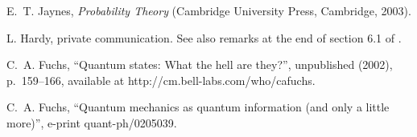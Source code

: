 \documentclass[pra,12pt,tightenlines]{revtex4}
\begin{document}
\begin{thebibliography}{10}
E.~T. Jaynes, {\em Probability Theory\/} 
(Cambridge University Press, Cambridge, 2003).

L. Hardy, private communication. See also remarks
at the end of section 6.1 of \cite{Hardy-0101}.

C.~A. Fuchs, ``Quantum states: What the hell are they?'', unpublished (2002), 
p.~159--166, available at http://cm.bell-labs.com/who/cafuchs.

C.~A. Fuchs, 
``Quantum mechanics as quantum information (and only a little more)'',
e-print quant-ph/0205039.

\end{thebibliography}
\end{document}
